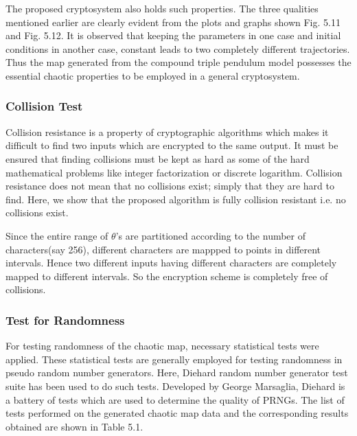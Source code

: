 The proposed cryptosystem also holds such properties. The three qualities mentioned earlier are clearly evident from the plots and graphs shown Fig. 5.11 and Fig. 5.12. It is observed that keeping the parameters in one case and initial conditions in another case, constant leads to two completely different trajectories. Thus the map generated from the compound triple pendulum model possesses the essential chaotic properties to be employed in a general cryptosystem. 

\subsubsection{Collision Test}
Collision resistance is a property of cryptographic algorithms which makes it difficult to find two inputs which are encrypted to the same output. It must be ensured that finding collisions must be kept as hard as some of the hard mathematical problems like integer factorization  or discrete logarithm. Collision resistance does not mean that no collisions exist; simply that they are hard to find. Here, we show that the proposed algorithm is fully collision resistant i.e. no collisions exist.

Since the entire range of $\theta$'s are partitioned according to the number of characters(say 256), different characters are mappped to points in different intervals. Hence two different inputs having different characters are completely mapped to different intervals. So the encryption scheme is completely free of collisions. 

\subsubsection{Test for Randomness}
For testing randomness of the chaotic map, necessary statistical tests were applied. These statistical tests are generally employed for testing randomness in pseudo random number generators. Here, Diehard random number generator test suite has been used to do such tests. Developed by George Marsaglia, Diehard is a battery of tests which are used to determine the quality of PRNGs. The list of tests performed on the generated chaotic map data and the corresponding results obtained are shown in Table 5.1.

